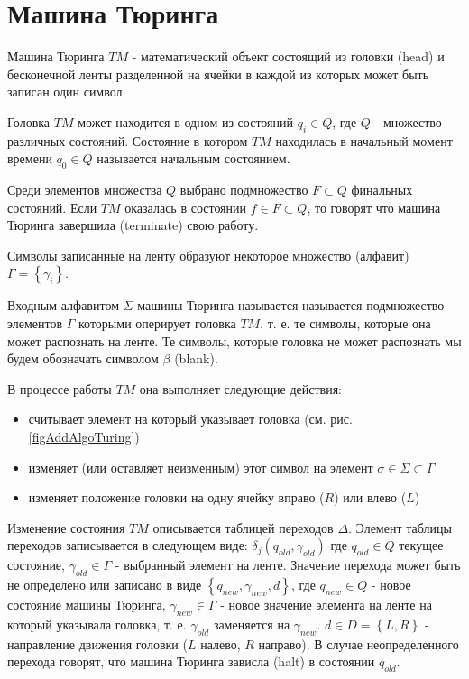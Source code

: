 \section{Машина Тюринга}
\label{addTuring}

Машина Тюринга $TM$ - математический объект состоящий из
головки (head) и бесконечной ленты разделенной на ячейки в каждой из
которых может быть записан один символ.



Головка $TM$ может находится в одном из состояний $q_i \in Q$, где $Q$
- множество различных состояний. Состояние в котором $TM$ находилась в
начальный момент времени $q_0 \in Q$ называется начальным состоянием. 

Среди элементов множества $Q$ выбрано подмножество $F \subset Q$
финальных состояний. Если $TM$ оказалась в состоянии $f \in F \subset
Q$, то говорят что машина Тюринга завершила (terminate) свою работу.

Символы записанные на ленту образуют некоторое множество (алфавит)
$\Gamma = \left\{\gamma_i\right\}$.

Входным алфавитом $\Sigma$ машины Тюринга называется называется
подмножество элементов $\Gamma$ которыми оперирует головка $TM$,
т. е. те символы, которые она может распознать на ленте. Те символы,
которые головка не может распознать мы будем обозначать символом
$\beta$ (blank).

В процессе работы $TM$ она выполняет следующие действия:
\begin{itemize}
\item{считывает элемент на который указывает головка
  (см. рис. \ref{figAddAlgoTuring})}
\item{изменяет (или оставляет неизменным) этот символ на элемент
  $\sigma \in \Sigma \subset \Gamma$}
\item{изменяет положение головки на одну ячейку вправо ($R$) или влево
($L$)}
\end{itemize}

Изменение состояния $TM$ описывается таблицей переходов
$\Delta$. Элемент таблицы переходов записывается в следующем виде: 
$\delta_j\left(q_{old}, \gamma_{old}\right)$ где $q_{old} \in Q$ текущее состояние,
$\gamma_{old} \in \Gamma$ - выбранный элемент на ленте. Значение
перехода может быть 
не определено или записано в виде $\left\{q_{new}, \gamma_{new}, d\right\}$, где
$q_{new} \in Q$ - новое состояние машины Тюринга, $\gamma_{new} \in \Gamma$ -
новое значение элемента на ленте на который указывала головка,
т. е. $\gamma_{old}$ заменяется на $\gamma_{new}$. $d \in D =
\left\{L, R\right\}$ - направление
движения головки ($L$ налево, $R$ направо). В случае неопределенного
перехода говорят, что машина Тюринга зависла (halt) в состоянии $q_{old}$.



